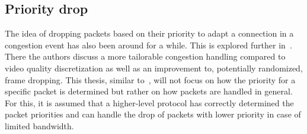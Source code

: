 \subsection{Priority drop}
The idea of dropping packets based on their priority to adapt a connection
in a congestion event has also been around for a while.
This is explored further in~\parencite{media-streaming-prio-drop}.
There the authors discuss a more tailorable congestion handling 
compared to video quality discretization as well as an improvement 
to, potentially randomized, frame dropping.
This thesis, similar to~\parencite{media-streaming-prio-drop}, will not focus
on how the priority for a specific packet is determined but rather on how
packets are handled in general.
For this, it is assumed that a higher-level protocol has correctly determined 
the packet priorities and can handle the drop of packets with lower priority
in case of limited bandwidth.
